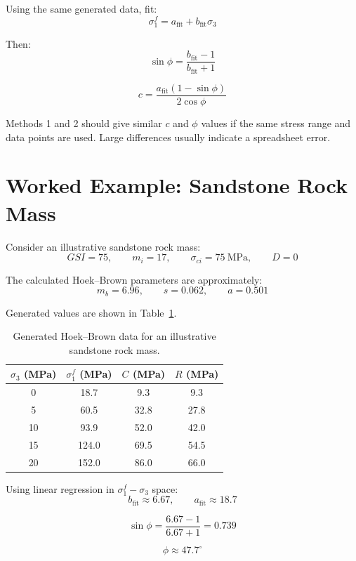 \documentclass[a4paper,12pt]{article}
\begin{document}
Using the same generated data, fit:
\[
\sigma_1^f=a_{\mathrm{fit}}+b_{\mathrm{fit}}\sigma_3
\]

Then:
\[
\sin\phi=
\frac{b_{\mathrm{fit}}-1}
{b_{\mathrm{fit}}+1}
\]

\[
c=
\frac{a_{\mathrm{fit}}(1-\sin\phi)}
{2\cos\phi}
\]

\begin{notebox}
Methods 1 and 2 should give similar \(c\) and \(\phi\) values if the same stress range
and data points are used. Large differences usually indicate a spreadsheet error.
\end{notebox}

\section{Worked Example: Sandstone Rock Mass}

Consider an illustrative sandstone rock mass:
\[
GSI=75,\qquad m_i=17,\qquad \sigma_{ci}=75~\text{MPa},\qquad D=0
\]

The calculated Hoek--Brown parameters are approximately:
\[
m_b=6.96,\qquad s=0.062,\qquad a=0.501
\]

Generated values are shown in Table~\ref{tab:example}.

\begin{table}[H]
\centering
\small
\begin{tabular}{c c c c}
\toprule
\(\sigma_3\) (MPa) & \(\sigma_1^f\) (MPa) & \(C\) (MPa) & \(R\) (MPa) \\
\midrule
0  & 18.7  & 9.3  & 9.3  \\
5  & 60.5  & 32.8 & 27.8 \\
10 & 93.9  & 52.0 & 42.0 \\
15 & 124.0 & 69.5 & 54.5 \\
20 & 152.0 & 86.0 & 66.0 \\
\bottomrule
\end{tabular}
\caption{Generated Hoek--Brown data for an illustrative sandstone rock mass.}
\label{tab:example}
\end{table}

Using linear regression in \(\sigma_1^f-\sigma_3\) space:
\[
b_{\mathrm{fit}}\approx 6.67,
\qquad
a_{\mathrm{fit}}\approx 18.7
\]

\[
\sin\phi=
\frac{6.67-1}{6.67+1}
=
0.739
\]

\[
\phi\approx47.7^\circ
\]
\end{document}
